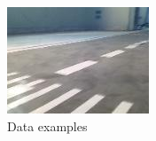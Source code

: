 \begin{figure}
\begin{minipage}[t]{0.3\linewidth}
\end{minipage}	\begin{minipage}[t]{0.3\linewidth}
\includegraphics[width=\textwidth]{images/Learningprocess/6.jpg}
\end{minipage}
  \caption[Data examples]{Data examples}\label{fig: Data examples}%
 \end{figure}
